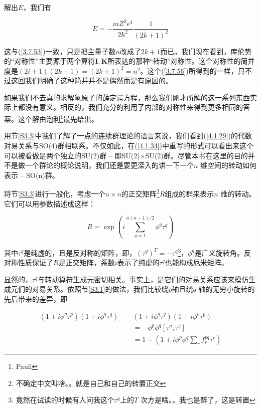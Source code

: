 \documentclass[UTF8,twoside]{ctexart}
\begin{document}
\noindent 解出$E$，我们有

\begin{equation}
E = -\frac{mZ^2e^4}{2\hbar^2}\frac{1}{(2k+1)^2}
\end{equation}

\noindent 这与(\ref{3.7.53})一致，只是把主量子数$n$改成了$2k+1$而已。我们现在看到，库伦势的“对称性”主要源于两个算符$\bm{I, K}$所表达的那种“转动”对称性。这个对称性的简并度是$(2i+1)(2k+1) = (2k+1)^2 = n^2$。这个(\ref{3.7.56})所得到的一样，只不过这回我们明确了这种简并并不是偶然而是有原因的。

如果我们不去真的求解氢原子的薛定谔方程，那么我们刚才所解的这一系列东西实际上都没有意义。相反的，我们充分的利用了内部的对称性来得到更多相同的答案。这个解由泡利\footnote[6]{Pauli}最先给出。

用节{\ref{S3.3}}中我们了解了一点的连续群理论的语言来说，我们看到(\ref{4.1.29})的代数对易关系与SO(4)群相联系。不仅如此，在(\ref{4.1.34})中重写的形式可以看出来这个可以被看做是两个独立的SU(2)群 -- 即SU(2)$\times$SU(2)群。尽管本书在这里的目的并不是做一个群论的概论说明，我们还是要更深入的讲一下一个$n$ 维空间的转动如何表示 -- SO(n)群。

将节{\ref{S3.3}}进行一般化，考虑一个$n\times n$的正交矩阵\footnote[7]{不确定中文叫啥。。就是自己和自己的转置正交}$R$组成的群来表示$n$ 维的转动。它们可以用参数描述成这样：

\begin{equation}
R = \exp\left(i\sum_{q = 1}^{n(n - 1)/2}\phi^q \tau^q\right)
\end{equation}

\noindent 其中$\tau^q$是纯虚的，且是反对称的矩阵，即，$\left(\tau^q\right)^T = -\tau^q$\footnote[8]{竟然在试读的时候有人问我这个$\tau^q$上的$T$ 次方是啥。。我也是醉了，这是转置}，$\phi^q$是广义旋转角。反对称性质保证了$R$是正交矩阵，系数$i$表示了纯虚的$\tau^q$也能构成厄米矩阵。

显然的，$\tau^q$与转动算符生成元密切相关。事实上，是它们的对易关系应该来模仿生成元们的对易关系。依照节{\ref{S3.1}}的做法，我们比较绕$p$轴且绕$q$ 轴的无穷小旋转的先后带来的差异，即

\begin{equation} \label{4.1.39}
\begin{split}
\left(1+i\phi^p\tau^p\right)\left(1+i\phi^q\tau^q\right) - & \left(1+i\phi^q \tau^q \right) \left(1+i\phi^p\tau^p\right)\\
&=-\phi^p\phi^q\left[\tau^p, \tau^q\right]\\
&=1-\left(1+i\phi^p\phi^q\sum_r f_r^{pq}\tau^r\right)
\end{split}
\end{equation}
\end{document}

